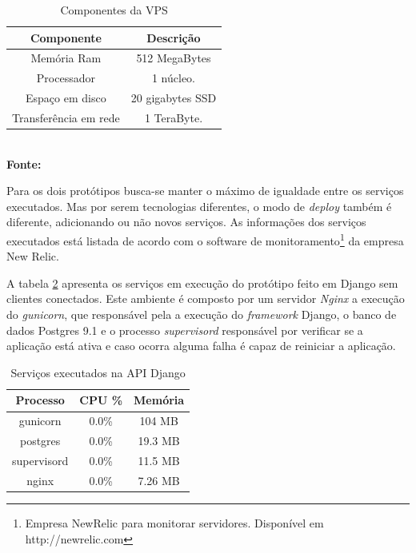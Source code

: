   \begin{table}[h]
    \centering
    \caption{\hspace{0.1cm} Componentes da VPS}
    \vspace{-0.3cm} %
    \label{tab:components-digital-ocean-vps}
    \begin{tabular}{c|c}
      \hline
      \textbf{Componente} & \textbf{Descrição} \\
      \hline
      Memória Ram & 512 MegaBytes \\
      Processador & 1 núcleo. \\
      Espaço em disco & 20 gigabytes SSD \\
      Transferência em rede & 1 TeraByte. \\
      \hline
    \end{tabular}
    \vspace{.1cm}  %
    \small
    {\footnotesize\\ \textbf{Fonte: \cite{digitaloceanprice}}}
  \end{table}

  Para os dois protótipos busca-se manter o máximo de igualdade entre os serviços executados. Mas por serem
  tecnologias diferentes, o modo de \textit{deploy} também é diferente, adicionando ou não novos serviços.
  As informações dos serviços executados está listada de acordo com o software de monitoramento\footnote[18]{ Empresa NewRelic para monitorar servidores. Disponível em http://newrelic.com}
  da empresa New Relic.

  A tabela \ref{tab:services-in-api-django} apresenta os serviços em execução do protótipo feito em Django sem clientes conectados.
  Este ambiente é composto por um servidor \textit{Nginx} a execução do \textit{gunicorn},
  que responsável pela a execução do \textit{framework} Django, o banco de dados Postgres 9.1 e o processo \textit{supervisord} responsável por
  verificar se a aplicação está ativa e caso ocorra alguma falha é capaz de reiniciar a aplicação.

  \begin{table}[h]
    \centering
    \footnotesize
    \setlength{\abovecaptionskip}{0pt}
    \setlength{\belowcaptionskip}{0pt}
    \caption[Serviços executados na API Django]{Serviços executados na API Django}
    \label{tab:services-in-api-django}
    \begin{tabular}{c|c|c}
      \hline \hline
      Processo  & 	CPU \% &	Memória \\
      \hline \hline
      gunicorn &	0.0\% &		104 MB \\
      postgres &	0.0\% &		19.3 MB \\
      supervisord &	0.0\% &		11.5 MB \\
      nginx &		0.0\% &		7.26 MB \\
      \hline \hline
    \end{tabular}
  \end{table}

